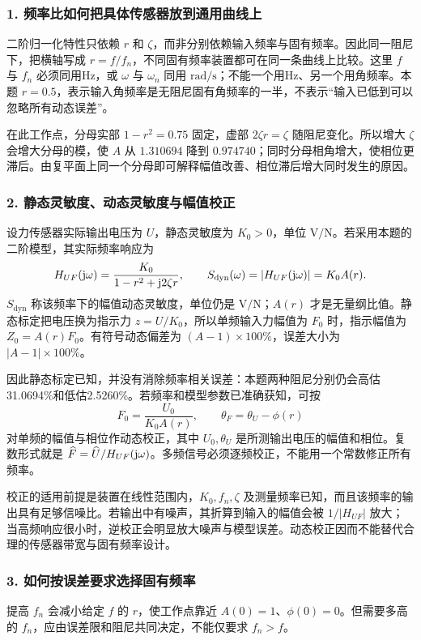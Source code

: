 \subsubsection*{1. 频率比如何把具体传感器放到通用曲线上}
二阶归一化特性只依赖 $r$ 和 $\zeta$，而非分别依赖输入频率与固有频率。因此同一阻尼下，把横轴写成 $r=f/f_n$，不同固有频率装置都可在同一条曲线上比较。这里 $f$ 与 $f_n$ 必须同用Hz，或 $\omega$ 与 $\omega_n$ 同用 $\mathrm{rad/s}$；不能一个用Hz、另一个用角频率。本题 $r=0.5$，表示输入角频率是无阻尼固有角频率的一半，不表示“输入已低到可以忽略所有动态误差”。

在此工作点，分母实部 $1-r^2=0.75$ 固定，虚部 $2\zeta r=\zeta$ 随阻尼变化。所以增大 $\zeta$ 会增大分母的模，使 $A$ 从 $1.310694$ 降到 $0.974740$；同时分母相角增大，使相位更滞后。由复平面上同一个分母即可解释幅值改善、相位滞后增大同时发生的原因。

\subsubsection*{2. 静态灵敏度、动态灵敏度与幅值校正}
设力传感器实际输出电压为 $U$，静态灵敏度为 $K_0>0$，单位 $\mathrm{V/N}$。若采用本题的二阶模型，其实际频率响应为
\[
H_{UF}(\mathrm{j}\omega)=\frac{K_0}{1-r^2+\mathrm{j}2\zeta r},\qquad
S_{\mathrm{dyn}}(\omega)=|H_{UF}(\mathrm{j}\omega)|=K_0A(r).
\]
$S_{\mathrm{dyn}}$ 称该频率下的幅值动态灵敏度，单位仍是 $\mathrm{V/N}$；$A(r)$ 才是无量纲比值。静态标定把电压换为指示力 $z=U/K_0$，所以单频输入力幅值为 $F_0$ 时，指示幅值为 $Z_0=A(r)F_0$。有符号动态偏差为 $(A-1)\times100\%$，误差大小为 $|A-1|\times100\%$。

因此静态标定已知，并没有消除频率相关误差：本题两种阻尼分别仍会高估31.0694\%和低估2.5260\%。若频率和模型参数已准确获知，可按
\[
F_0=\frac{U_0}{K_0A(r)},\qquad
\theta_F=\theta_U-\phi(r)
\]
对单频的幅值与相位作动态校正，其中 $U_0,\theta_U$ 是所测输出电压的幅值和相位。复数形式就是 $\widehat F=\widehat U/H_{UF}(\mathrm{j}\omega)$。多频信号必须逐频校正，不能用一个常数修正所有频率。

校正的适用前提是装置在线性范围内，$K_0,f_n,\zeta$ 及测量频率已知，而且该频率的输出具有足够信噪比。若输出中有噪声，其折算到输入的幅值会被 $1/|H_{UF}|$ 放大；当高频响应很小时，逆校正会明显放大噪声与模型误差。动态校正因而不能替代合理的传感器带宽与固有频率设计。

\subsubsection*{3. 如何按误差要求选择固有频率}
提高 $f_n$ 会减小给定 $f$ 的 $r$，使工作点靠近 $A(0)=1$、$\phi(0)=0$。但需要多高的 $f_n$，应由误差限和阻尼共同决定，不能仅要求 $f_n>f$。

